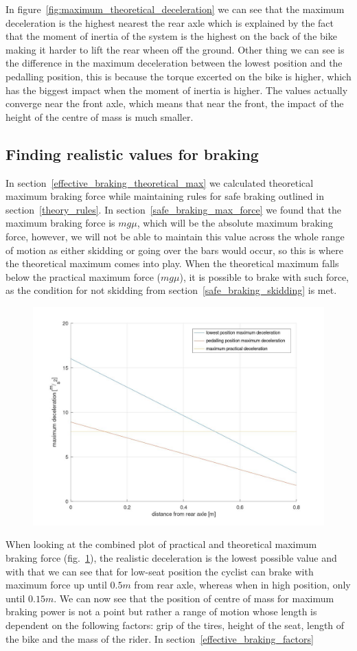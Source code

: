 \documentclass[12pt, a4]{article}
\begin{document}
In figure~\ref{fig:maximum_theoretical_deceleration} we can see that the maximum deceleration is the highest nearest the rear axle
which is explained by the fact that the moment of inertia of the system is the highest on the back of the bike making it harder
to lift the rear wheen off the ground. Other thing we can see is the difference in the maximum deceleration between the lowest
position and the pedalling position, this is because the torque excerted on the bike is higher, which has the biggest impact when
the moment of inertia is higher. The values actually converge near the front axle, which means that near the front, the impact 
of the height of the centre of mass is much smaller. 
\subsection{Finding realistic values for braking}\label{effective_braking_realistic_max}
In section~\ref{effective_braking_theoretical_max} we calculated theoretical maximum braking force while maintaining
rules for safe braking outlined in section~\ref{theory_rules}. 
In section~\ref{safe_braking_max_force} we found that the maximum braking force is $mg\mu$, which will be the absolute
maximum braking force, however, we will not be able to maintain this value across the whole range of motion as 
either skidding or going over the bars would occur, so  this is where the theoretical maximum comes into play. 
When the theoretical maximum falls below the practical maximum force ($mg\mu$), it is possible to brake with such force, 
as the condition for not skidding from section~\ref{safe_braking_skidding} is met. 
\begin{figure}[H]
\caption{}
\centering%
\label{fig:maximum_practical_deceleration}
\includegraphics[width=0.7\linewidth]{maximum_practical_deceleration}%
\end{figure}
When looking at the combined plot of practical and theoretical maximum braking force (fig.~\ref{fig:maximum_practical_deceleration}), 
the realistic deceleration is the lowest possible value and with that we can see that for low-seat position the cyclist can brake 
with maximum force up until $0.5m$ from rear axle, whereas when in high position, only until $0.15m$. We can now see that the 
position of centre of mass for maximum braking power is not a point but rather a range of motion whose length is dependent on 
the following factors: grip of the tires, height of the seat, length of the bike and the mass of the rider. 
In section~\ref{effective_braking_factors}
\end{document}
